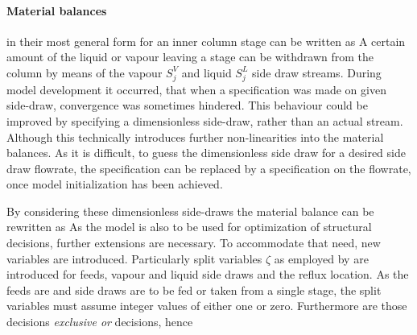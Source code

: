         \paragraph{Material balances} in their most general form for an inner column stage can be written as
        A certain amount of the liquid or vapour leaving a stage can be withdrawn from the column by means
        of the vapour $S^V_j$ and liquid $S^L_j$ side draw streams. During model development it occurred, that
        when a specification was made on given side-draw, convergence was sometimes hindered. This behaviour
        could be improved by specifying a dimensionless side-draw,
        rather than an actual stream. Although this technically introduces further non-linearities
        into the material balances. As it is difficult, to guess the dimensionless side draw
        for a desired side draw flowrate, the specification can be replaced by a specification
        on the flowrate, once model initialization has been achieved.

        By considering these dimensionless side-draws the material balance can be rewritten as
        As the model is also to be used for optimization of structural decisions, further extensions are necessary.
        To accommodate that need, new variables are introduced. Particularly split variables $\zeta$ as employed
        by \cite{Dunnebier.1999} are introduced for feeds, vapour and liquid side draws and the reflux location.
        As the feeds are and side draws are to be fed or taken from a single stage, the split variables must assume
        integer values of either one or zero. Furthermore are those decisions \emph{exclusive or} decisions, hence

